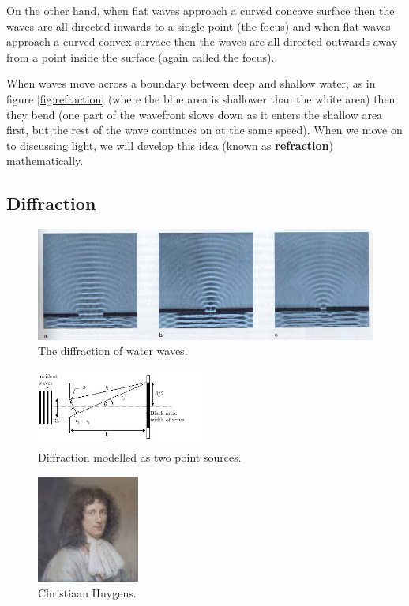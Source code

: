 \documentclass[a4paper]{amsbook}
\newcommand\capcite[1]{}
\begin{document}
On the other hand, when flat waves approach a curved concave surface then the waves are all directed inwards to a single point (the focus)
and when flat waves approach a curved convex survace then the waves are all directed outwards away from a point inside the surface (again called
the focus).

When waves move across a boundary between deep and shallow water, as in figure \ref{fig:refraction} (where the blue area is shallower than the white area)
then they bend (one part of the wavefront slows down as it enters the shallow area first, but the rest of the wave continues on at the same speed).
When we move on to discussing light, we will develop this idea (known as \textbf{refraction}) mathematically.

\subsection{Diffraction}
\begin{figure}
  \centering
  \includegraphics[width=\textwidth]{diffraction}
  \caption{The diffraction of water waves. \capcite{http://electron6.phys.utk.edu/light/images1-3/single1.jpg}\label{fig:diffraction}}
\end{figure}
\begin{figure}
  \centering
  \includegraphics[width=0.5\textwidth]{huygens2}
  \caption{Diffraction modelled as two point sources.\label{fig:huygens2}}
\end{figure}
\begin{figure}
  \centering
  \includegraphics[width=0.3\textwidth]{huygens}
  \caption{Christiaan Huygens.\label{fig:huygens}}
\end{figure}
\end{document}
